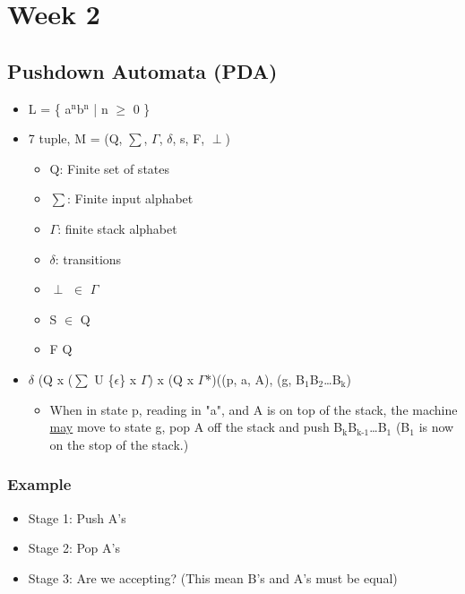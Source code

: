\documentclass[11pt]{article}
\date{\today}
\title{}
\begin{document}
\tableofcontents

\section{Week 2}
\label{sec:org9163c50}
\subsection{Pushdown Automata (PDA)}
\label{sec:org20c6ed0}
\begin{itemize}
\item L = \{ a\(^{\text{n}}\)b\(^{\text{n}}\) | n \(\ge\) 0 \}
\item 7 tuple, M = (Q, \(\sum\), \(\Gamma\), \(\delta\), s, F, \(\perp\))
\begin{itemize}
\item Q: Finite set of states
\item \(\sum\): Finite input alphabet
\item \(\Gamma\): finite stack alphabet
\item \(\delta\): transitions
\item \(\perp\) \(\in\) \(\Gamma\)
\item S \(\in\) Q
\item F \subseteq Q
\end{itemize}

\item \(\delta\) \subseteq (Q x (\(\sum\) U \{\(\epsilon\)\} x \(\Gamma\)) x (Q x \(\Gamma\)*)((p, a, A), (g, B\(_{\text{1}}\)B\(_{\text{2}}\)\ldots{}B\(_{\text{k}}\))
\begin{itemize}
\item When in state p, reading in "a", and A is on top of the stack, the machine \uline{may} move
to state g, pop A off the stack and push B\(_{\text{k}}\)B\(_{\text{k-1}}\)\ldots{}B\(_{\text{1}}\) (B\(_{\text{1}}\) is now on the stop of the stack.)
\end{itemize}
\end{itemize}
\subsubsection{Example}
\label{sec:org5b17cd4}
\begin{itemize}
\item Stage 1: Push A's
\item Stage 2: Pop A's
\item Stage 3: Are we accepting? (This mean B's and A's must be equal)
\end{itemize}
\end{document}
